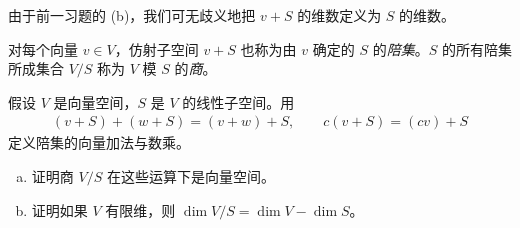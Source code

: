 \documentclass[../../main.tex]{subfiles}
\begin{document}
由于前一习题的 (b)，我们可无歧义地把 $v+S$ 的维数定义为 $S$ 的维数。

对每个向量 $v\in V$，仿射子空间 $v+S$ 也称为由 $v$ 确定的 $S$ 的\emph{陪集}。$S$ 的所有陪集所成集合 $V/S$ 称为 $V$ 模 $S$ 的\emph{商}。

\begin{exercise}\label{exercise:appB-B-11}
假设 $V$ 是向量空间，$S$ 是 $V$ 的线性子空间。用
\begin{align*}
(v+S)+(w+S)=(v+w)+S,\qquad c(v+S)=(cv)+S
\end{align*}
定义陪集的向量加法与数乘。
\begin{enumerate}[(a)]
\item 证明商 $V/S$ 在这些运算下是向量空间。
\item 证明如果 $V$ 有限维，则 $\dim V/S=\dim V-\dim S$。
\end{enumerate}
\end{exercise}
\end{document}
